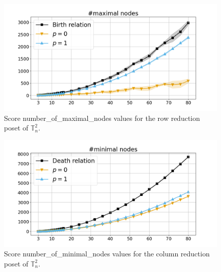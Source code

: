 \documentclass{article}
\begin{document}
    \begin{figure}[h!]
        \centering
        \hspace*{-0.24\textwidth}
        \includegraphics[width=1.4\textwidth]{pics/extended torus scores/score=number-of-maximal-nodes, dim=2, object=row reduction.png}
        \caption{Score number\_of\_maximal\_nodes values for the row reduction poset of $\mathbb{T}_n^{2}$.}
        \label{fig:numberofmaximalnodes-rowreduction2}
    \end{figure}
    \begin{figure}[h!]
        \centering
        \hspace*{-0.24\textwidth}
        \includegraphics[width=1.4\textwidth]{pics/extended torus scores/score=number-of-minimal-nodes, dim=2, object=column reduction.png}
        \caption{Score number\_of\_minimal\_nodes values for the column reduction poset of $\mathbb{T}_n^{2}$.}
        \label{fig:numberofminimalnodes-columnreduction2}
    \end{figure}
\end{document}
